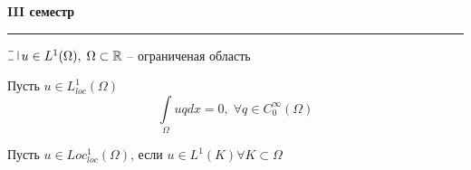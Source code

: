 
\begin{center}
  {\large \bf III семестр}
  \rule{\textwidth}{1pt}
\end{center}

\begin{definition}[Усреднение]
$\letus \, u \in L^1(\Omega), \; \Omega \subset \mathbb{R}$ -- ограниченая область
\end{definition}

\begin{lemma}
  Пусть $u \in L^1_{loc}(\Omega)$\\
  $$\int\limits_\Omega uq dx = 0, \; \forall q \in C_0^\infty(\Omega)$$
\end{lemma}

\begin{definition}
  Пусть $u \in Loc_{loc}^1(\Omega)$, если $u \in L^1(K) \forall K \subset \Omega$
\end{definition}
